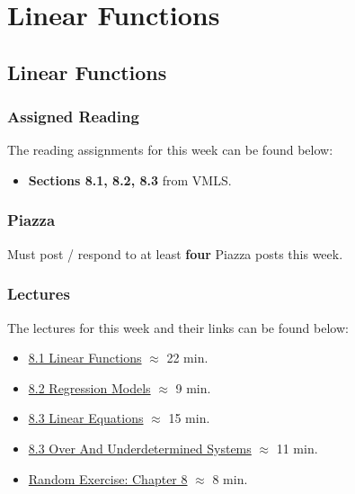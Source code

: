 \clearpage

\renewcommand{\ChapTitle}{Linear Functions}
\renewcommand{\SectionTitle}{Linear Functions}

\chapter{\ChapTitle}
\section{\SectionTitle}

\subsection{Assigned Reading}

The reading assignments for this week can be found below:

\begin{itemize}
    \item \textbf{Sections 8.1, 8.2, 8.3} from VMLS.
\end{itemize}

\subsection{Piazza}

Must post / respond to at least \textbf{four} Piazza posts this week.  

\subsection{Lectures}

The lectures for this week and their links can be found below:

\begin{itemize}
    \item \href{https://applied.cs.colorado.edu/mod/hvp/view.php?id=50757}{8.1 Linear Functions} $\approx$ 22 min.
    \item \href{https://applied.cs.colorado.edu/mod/hvp/view.php?id=50758}{8.2 Regression Models} $\approx$ 9 min.
    \item \href{https://applied.cs.colorado.edu/mod/hvp/view.php?id=50759}{8.3 Linear Equations} $\approx$ 15 min.
    \item \href{https://applied.cs.colorado.edu/mod/hvp/view.php?id=50760}{8.3 Over And Underdetermined Systems} $\approx$ 11 min.
    \item \href{https://applied.cs.colorado.edu/mod/hvp/view.php?id=50761}{Random Exercise: Chapter 8} $\approx$ 8 min.
\end{itemize}

